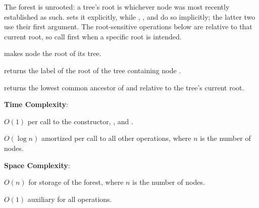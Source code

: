 The forest is unrooted: a tree's root is whichever node was most recently established as such.  sets it explicitly, while , , and  do so implicitly; the latter two use their first argument. The root-sensitive operations below are relative to that current root, so call  first when a specific root  is intended.

\begin{compactitem}
  \item {} makes node  the root of its tree.
  \item {} returns the label of the root of the tree containing node .
  \item {} returns the lowest common ancestor of  and  relative to the tree's current root.
\end{compactitem}

\textbf{Time Complexity}:
\begin{compactitem}
  \item $O(1)$ per call to the constructor, , and .
  \item $O(\log n)$ amortized per call to all other operations, where $n$ is the number of nodes.
\end{compactitem}

\textbf{Space Complexity}:
\begin{compactitem}
  \item $O(n)$ for storage of the forest, where $n$ is the number of nodes.
  \item $O(1)$ auxiliary for all operations.
\end{compactitem}

